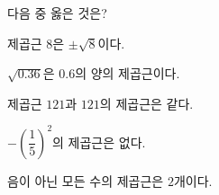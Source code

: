 다음 중 옳은 것은?
\begin{choicesv}{\rule[-3ex]{0pt}{8ex}제곱근 $8$은 $\pm\sqrt{8}$이다.}{\rule[-3ex]{0pt}{8ex}$\sqrt{0.36}$은 $0.6$의 양의 제곱근이다.}{\rule[-3ex]{0pt}{8ex}제곱근 $121$과 $121$의 제곱근은 같다.}{\rule[-3ex]{0pt}{8ex}$-\left(\dfrac{1}{5}\right)^2$의 제곱근은 없다.}{\rule[-3ex]{0pt}{8ex}음이 아닌 모든 수의 제곱근은 $2$개이다.}\end{choicesv}

